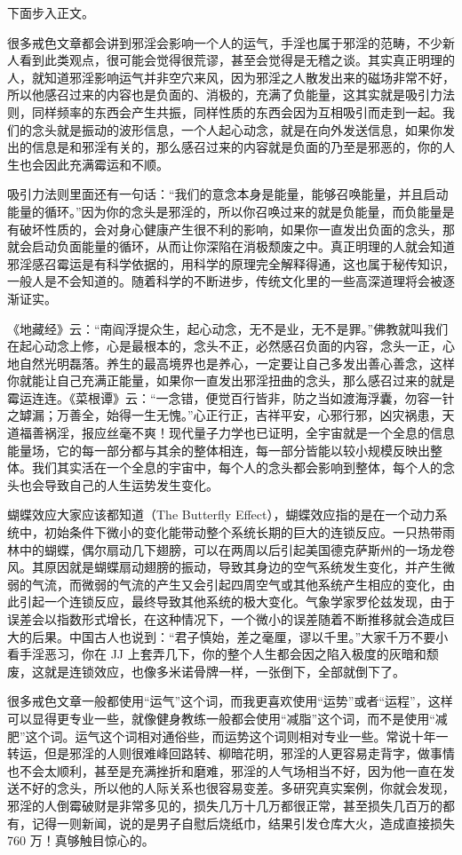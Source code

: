 下面步入正文。

很多戒色文章都会讲到邪淫会影响一个人的运气，手淫也属于邪淫的范畴，不少新人看到此类观点，很可能会觉得很荒谬，甚至会觉得是无稽之谈。其实真正明理的人，就知道邪淫影响运气并非空穴来风，因为邪淫之人散发出来的磁场非常不好，所以他感召过来的内容也是负面的、消极的，充满了负能量，这其实就是吸引力法则，同样频率的东西会产生共振，同样性质的东西会因为互相吸引而走到一起。我们的念头就是振动的波形信息，一个人起心动念，就是在向外发送信息，如果你发出的信息是和邪淫有关的，那么感召过来的内容就是负面的乃至是邪恶的，你的人生也会因此充满霉运和不顺。

吸引力法则里面还有一句话：“我们的意念本身是能量，能够召唤能量，并且启动能量的循环。”因为你的念头是邪淫的，所以你召唤过来的就是负能量，而负能量是有破坏性质的，会对身心健康产生很不利的影响，如果你一直发出负面的念头，那就会启动负面能量的循环，从而让你深陷在消极颓废之中。真正明理的人就会知道邪淫感召霉运是有科学依据的，用科学的原理完全解释得通，这也属于秘传知识，一般人是不会知道的。随着科学的不断进步，传统文化里的一些高深道理将会被逐渐证实。

《地藏经》云：“南阎浮提众生，起心动念，无不是业，无不是罪。”佛教就叫我们在起心动念上修，心是最根本的，念头不正，必然感召负面的内容，念头一正，心地自然光明磊落。养生的最高境界也是养心，一定要让自己多发出善心善念，这样你就能让自己充满正能量，如果你一直发出邪淫扭曲的念头，那么感召过来的就是霉运连连。《菜根谭》云：“一念错，便觉百行皆非，防之当如渡海浮囊，勿容一针之罅漏；万善全，始得一生无愧。”心正行正，吉祥平安，心邪行邪，凶灾祸患，天道福善祸淫，报应丝毫不爽！现代量子力学也已证明，全宇宙就是一个全息的信息能量场，它的每一部分都与其余的整体相连，每一部分皆能以较小规模反映出整体。我们其实活在一个全息的宇宙中，每个人的念头都会影响到整体，每个人的念头也会导致自己的人生运势发生变化。

蝴蝶效应大家应该都知道（The Butterfly Effect），蝴蝶效应指的是在一个动力系统中，初始条件下微小的变化能带动整个系统长期的巨大的连锁反应。一只热带雨林中的蝴蝶，偶尔扇动几下翅膀，可以在两周以后引起美国德克萨斯州的一场龙卷风。其原因就是蝴蝶扇动翅膀的振动，导致其身边的空气系统发生变化，并产生微弱的气流，而微弱的气流的产生又会引起四周空气或其他系统产生相应的变化，由此引起一个连锁反应，最终导致其他系统的极大变化。气象学家罗伦兹发现，由于误差会以指数形式增长，在这种情况下，一个微小的误差随着不断推移就会造成巨大的后果。中国古人也说到：“君子慎始，差之毫厘，谬以千里。”大家千万不要小看手淫恶习，你在 JJ 上套弄几下，你的整个人生都会因之陷入极度的灰暗和颓废，这就是连锁效应，也像多米诺骨牌一样，一张倒下，全部就倒下了。

很多戒色文章一般都使用“运气”这个词，而我更喜欢使用“运势”或者“运程”，这样可以显得更专业一些，就像健身教练一般都会使用“减脂”这个词，而不是使用“减肥”这个词。运气这个词相对通俗些，而运势这个词则相对专业一些。常说十年一转运，但是邪淫的人则很难峰回路转、柳暗花明，邪淫的人更容易走背字，做事情也不会太顺利，甚至是充满挫折和磨难，邪淫的人气场相当不好，因为他一直在发送不好的念头，所以他的人际关系也很容易变差。多研究真实案例，你就会发现，邪淫的人倒霉破财是非常多见的，损失几万十几万都很正常，甚至损失几百万的都有，记得一则新闻，说的是男子自慰后烧纸巾，结果引发仓库大火，造成直接损失 760 万！真够触目惊心的。

